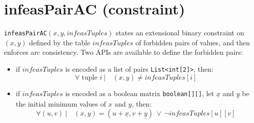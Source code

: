 \label{infeaspairac}
\hypertarget{infeaspairac}{}

\section{infeasPairAC (constraint)}\label{infeaspairac:infeaspairacconstraint}\hypertarget{infeaspairac:infeaspairacconstraint}{}
\begin{notedef}
  \texttt{infeasPairAC}$(x,y,infeasTuples)$ states an extensional binary constraint on $(x,y)$ defined by the table $infeasTuples$ of forbidden pairs of values, and then enforces arc consistency. Two APIs are available to define the forbidden pairs:
\begin{itemize}
	\item if $infeasTuples$ is encoded as a list of pairs \texttt{List<int[2]>}, then:
      $$\forall \text{ tuple } i\ |\quad (x,y)\neq infeasTuples[i]$$
	\item if $infeasTuples$ is encoded as a boolean matrix \texttt{boolean[][]}, let $\underline{x}$ and  $\underline{y}$ be the initial minimum values of $x$ and $y$, then:
      $$\forall (u,v)\ |\quad (x,y)=(u+\underline{x},v+\underline{y})\ \lor\ \neg infeasTuples[u][v]$$
\end{itemize}
\end{notedef}

